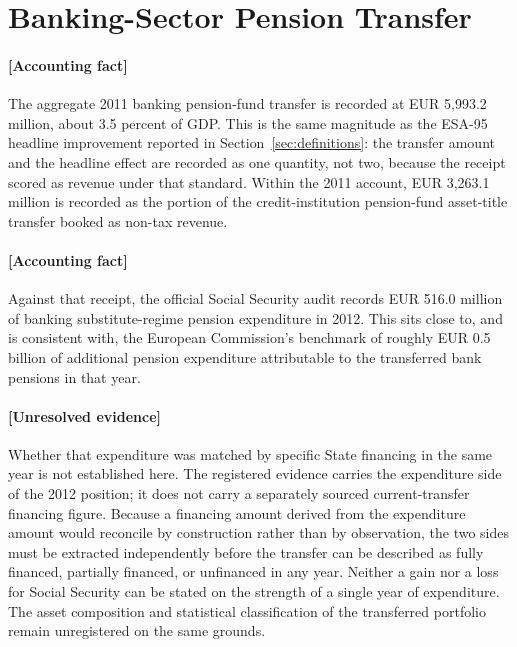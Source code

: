 \documentclass[11pt]{article}
\begin{document}
\section{Banking-Sector Pension Transfer}
\label{sec:banking}
\paragraph{[Accounting fact]}
The aggregate 2011 banking pension-fund transfer is recorded at EUR 5,993.2 million, about 3.5 percent of GDP. This is the same magnitude as the ESA-95 headline improvement reported in Section~\ref{sec:definitions}: the transfer amount and the headline effect are recorded as one quantity, not two, because the receipt scored as revenue under that standard. Within the 2011 account, EUR 3,263.1 million is recorded as the portion of the credit-institution pension-fund asset-title transfer booked as non-tax revenue.

\paragraph{[Accounting fact]}
Against that receipt, the official Social Security audit records EUR 516.0 million of banking substitute-regime pension expenditure in 2012. This sits close to, and is consistent with, the European Commission's benchmark of roughly EUR 0.5 billion of additional pension expenditure attributable to the transferred bank pensions in that year.

\paragraph{[Unresolved evidence]}
Whether that expenditure was matched by specific State financing in the same year is not established here. The registered evidence carries the expenditure side of the 2012 position; it does not carry a separately sourced current-transfer financing figure. Because a financing amount derived from the expenditure amount would reconcile by construction rather than by observation, the two sides must be extracted independently before the transfer can be described as fully financed, partially financed, or unfinanced in any year. Neither a gain nor a loss for Social Security can be stated on the strength of a single year of expenditure. The asset composition and statistical classification of the transferred portfolio remain unregistered on the same grounds.
\end{document}
